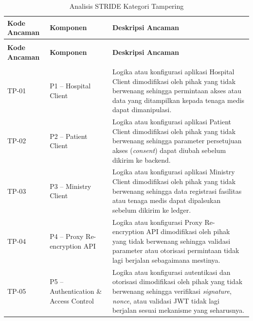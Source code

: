 \begin{xltabular}{\textwidth}{|>{\centering\arraybackslash}p{1.8cm}|>{\raggedright\arraybackslash}p{3.2cm}|X|}
    \caption{Analisis STRIDE Kategori Tampering}
    \label{tab:stride-tampering} \\
    \hline
    \textbf{Kode Ancaman} &
    \textbf{Komponen} &
    \textbf{Deskripsi Ancaman} \\
    \hline
    \endfirsthead

    {} \\
    \hline
    \textbf{Kode Ancaman} &
    \textbf{Komponen} &
    \textbf{Deskripsi Ancaman} \\
    \hline
    \endhead

    \hline
     \\
    \endfoot

    \hline
    \endlastfoot

    TP-01 &
    P1 -- Hospital Client &
    Logika atau konfigurasi aplikasi Hospital Client dimodifikasi oleh pihak yang tidak berwenang sehingga permintaan akses atau data yang ditampilkan kepada tenaga medis dapat dimanipulasi. \\
    \hline

    TP-02 &
    P2 -- Patient Client &
    Logika atau konfigurasi aplikasi Patient Client dimodifikasi oleh pihak yang tidak berwenang sehingga parameter persetujuan akses (\textit{consent}) dapat diubah sebelum dikirim ke backend. \\
    \hline

    TP-03 &
    P3 -- Ministry Client &
    Logika atau konfigurasi aplikasi Ministry Client dimodifikasi oleh pihak yang tidak berwenang sehingga data registrasi fasilitas atau tenaga medis dapat dipalsukan sebelum dikirim ke ledger. \\
    \hline

    TP-04 &
    P4 -- Proxy Re-encryption API &
    Logika atau konfigurasi Proxy Re-encryption API dimodifikasi oleh pihak yang tidak berwenang sehingga validasi parameter atau otorisasi permintaan tidak lagi berjalan sebagaimana mestinya. \\
    \hline

    TP-05 &
    P5 -- Authentication \& Access Control &
    Logika atau konfigurasi autentikasi dan otorisasi dimodifikasi oleh pihak yang tidak berwenang sehingga verifikasi \textit{signature}, \textit{nonce}, atau validasi JWT tidak lagi berjalan sesuai mekanisme yang seharusnya. \\
    \hline


\end{xltabular}
